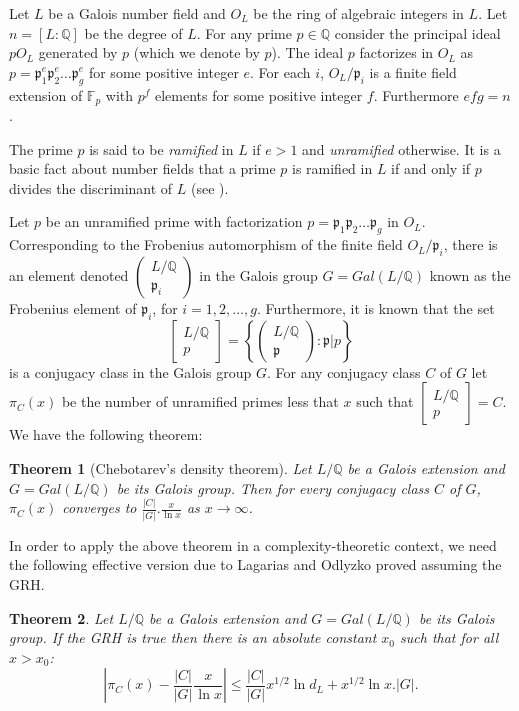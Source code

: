 \documentclass{article}
\newtheorem{theorem}{Theorem}[section]
\newcommand{\Ideal}[1]{\ensuremath{\mathfrak{#1}}}
\newcommand{\Gal}[1]{\ensuremath{Gal\left(#1\right)}}
\newcommand{\Q}[0]{\ensuremath{\mathbb{Q}}}
\newcommand{\Frob}[2]
{\ensuremath
  {\left(
      \begin{array}{c}
        #1\\
        \hline
        #2
      \end{array}
    \right)
  }
}
\newcommand{\Artin}[2]
{\ensuremath
  {\left[
      \begin{array}{c}
        #1\\
        \hline
        #2
      \end{array}
    \right]
  }
}
\begin{document}
Let $L$ be a Galois number field and $O_L$ be the ring of algebraic
integers in $L$. Let $n = [L : \Q]$ be the degree of $L$. For any
prime $p \in \Q$ consider the principal ideal $pO_L$ generated by $p$
(which we denote by $p$).  The ideal $p$ factorizes in $O_L$ as $p =
\Ideal{p}_1^{e} \Ideal{p}_2^{e} \ldots \Ideal{p}_g^{e}$ for some
positive integer $e$. For each $i$, $O_L/\Ideal{p}_i$ is a finite
field extension of $\mathbb{F}_p$ with $p^{f}$ elements for some
positive integer $f$. Furthermore $efg=n$.

The prime $p$ is said to be \emph{ramified} in $L$ if $e>1$ and
\emph{unramified} otherwise. It is a basic fact about number fields
that a prime $p$ is ramified in $L$ if and only if $p$ divides the
discriminant of $L$ (see \cite[Theorem 1, pg. 238]{ribenboim:1999}).

Let $p$ be an unramified prime with factorization $p =
\Ideal{p}_1\Ideal{p}_2 \ldots \Ideal{p}_g$ in $O_L$. Corresponding to
the Frobenius automorphism of the finite field $O_L/\Ideal{p}_i$,
there is an element denoted $\Frob{L/\Q}{\Ideal{p}_i}$ in the Galois
group $G=\Gal{L/\Q}$ known as the Frobenius element of $\Ideal{p}_i$,
for $i=1, 2,\ldots,g$. Furthermore, it is known that the set
\[
\Artin{L/\Q}{p} = \left\{ \Frob{L/\Q}{\Ideal{p}} : \Ideal{p} | p
\right\}
\]
is a conjugacy class in the Galois group $G$. For any conjugacy class
$C$ of $G$ let $\pi_C(x)$ be the number of unramified primes less that
$x$ such that $\Artin{L/\Q}{p} = C$. We have the following theorem:

\begin{theorem}[Chebotarev's density theorem]\label{chebo}
  Let $L/\Q$ be a Galois extension and $G=\Gal{L/\Q}$ be its Galois
  group. Then for every conjugacy class $C$ of $G$, $\pi_C(x)$
  converges to $\frac{|C|}{|G|}.\frac{x}{\ln x}$ as $x \to \infty$.
\end{theorem}

In order to apply the above theorem in a complexity-theoretic context,
we need the following effective version due to Lagarias and Odlyzko
\cite{lagarias:1977:effective} proved assuming the GRH.

\begin{theorem}\label{eff:chebo}
  Let $L/\Q$ be a Galois extension and $G=\Gal{L/\Q}$ be its Galois
  group. If the GRH is true then there is an absolute constant $x_0$
  such that for all $x > x_0$:
  \[
  \left|\pi_C(x) - \frac{|C|}{|G|} \frac{x}{\ln x} \right| \leq  \frac{|C|}{|G|}
    x^{1/2} \ln{d_L} + x^{1/2}\ln{x}. |G|.
  \]
\end{theorem}
\end{document}
